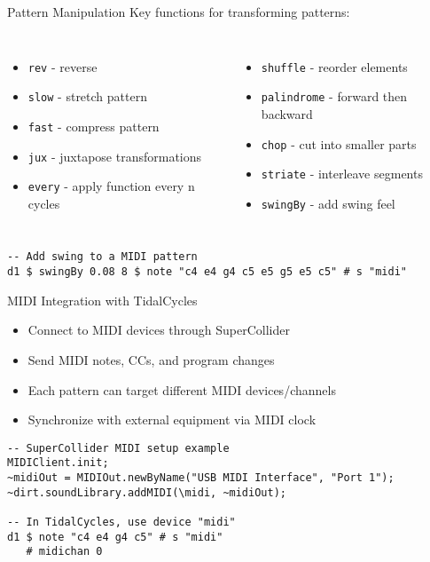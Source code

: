 \documentclass{beamer}
\begin{document}
\begin{frame}[fragile]{Pattern Manipulation}
Key functions for transforming patterns:
\begin{columns}
\begin{itemize}
    \item \texttt{rev} - reverse
    \item \texttt{slow} - stretch pattern
    \item \texttt{fast} - compress pattern
    \item \texttt{jux} - juxtapose transformations
    \item \texttt{every} - apply function every n cycles
\end{itemize}

\begin{itemize}
    \item \texttt{shuffle} - reorder elements
    \item \texttt{palindrome} - forward then backward
    \item \texttt{chop} - cut into smaller parts
    \item \texttt{striate} - interleave segments
    \item \texttt{swingBy} - add swing feel
\end{itemize}
\end{columns}

\begin{lstlisting}[style=tidal]
-- Add swing to a MIDI pattern
d1 $ swingBy 0.08 8 $ note "c4 e4 g4 c5 e5 g5 e5 c5" # s "midi"
\end{lstlisting}
\end{frame}



\begin{frame}[fragile]{MIDI Integration with TidalCycles}
\begin{itemize}
    \item Connect to MIDI devices through SuperCollider
    \item Send MIDI notes, CCs, and program changes
    \item Each pattern can target different MIDI devices/channels
    \item Synchronize with external equipment via MIDI clock
\end{itemize}

\begin{lstlisting}[style=tidal]
-- SuperCollider MIDI setup example
MIDIClient.init;
~midiOut = MIDIOut.newByName("USB MIDI Interface", "Port 1");
~dirt.soundLibrary.addMIDI(\midi, ~midiOut);

-- In TidalCycles, use device "midi"
d1 $ note "c4 e4 g4 c5" # s "midi" 
   # midichan 0
\end{lstlisting}
\end{frame}
\end{document}
